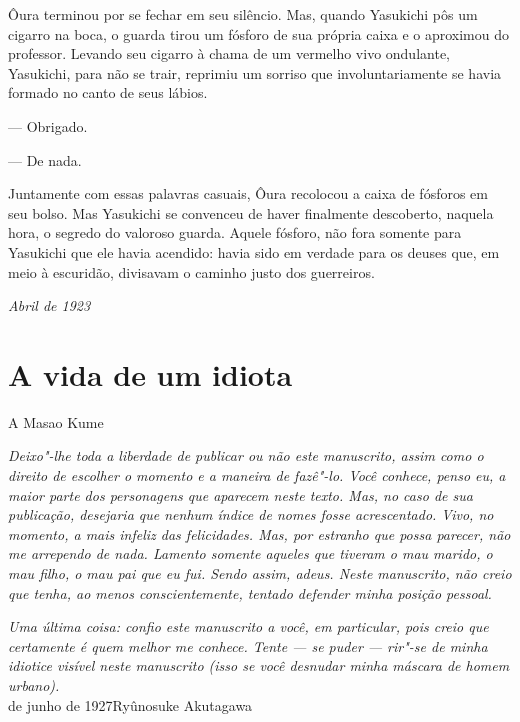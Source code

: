 Ôura terminou por se fechar em seu silêncio. Mas, quando Yasukichi pôs
um cigarro na boca, o guarda tirou um fósforo de sua própria caixa e o
aproximou do professor. Levando seu cigarro à chama de um vermelho vivo
ondulante, Yasukichi, para não se trair, reprimiu um sorriso que
involuntariamente se havia formado no canto de seus lábios.

--- Obrigado.

--- De nada.

Juntamente com essas palavras casuais, Ôura recolocou a caixa de
fósforos em seu bolso. Mas Yasukichi se convenceu de haver finalmente
descoberto, naquela hora, o segredo do valoroso guarda. Aquele fósforo,
não fora somente para Yasukichi que ele havia acendido: havia sido em
verdade para os deuses que, em meio à escuridão, divisavam o caminho
justo dos guerreiros.

\begin{flushright}
\textit{Abril de 1923}\\  
\end{flushright}

\chapter{A vida de um idiota}


\begin{flushright}
A Masao Kume\\
\end{flushright}

\noindent\textit{Deixo"-lhe toda a liberdade de publicar ou não este manuscrito, assim
como o direito de escolher o momento e a maneira de fazê"-lo. Você
conhece, penso eu, a maior parte dos personagens que aparecem neste
texto. Mas, no caso de sua publicação, desejaria que nenhum índice de
nomes fosse acrescentado. Vivo, no momento, a mais infeliz das
felicidades. Mas, por estranho que possa parecer, não me arrependo de
nada. Lamento somente aqueles que tiveram o mau marido, o mau filho, o
mau pai que eu fui. Sendo assim, adeus. Neste manuscrito, não creio que
tenha, ao menos conscientemente, tentado defender minha posição pessoal.}

\textit{Uma última coisa: confio este manuscrito a você, em particular, pois
creio que certamente é quem melhor me conhece. Tente --- se puder ---
rir"-se de minha idiotice visível neste manuscrito (isso se você
desnudar minha máscara de homem urbano).}\\

 de junho de 1927Ryûnosuke Akutagawa\\  

